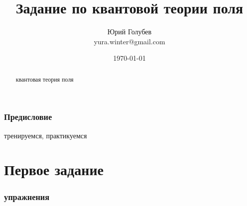 \documentclass[a4paper,12pt]{article} %
\author{Юрий Голубев\\ yura.winter@gmail.com }
\title{Задание по квантовой теории поля}
\date{\today}
\begin{document}
\maketitle

\begin{abstract}
квантовая теория поля
\end{abstract}
\tableofcontents


\section*{Предисловие}

тренируемся, практикуемся





\clearpage
\part{Первое задание}


\section{упражнения}
\end{document}
